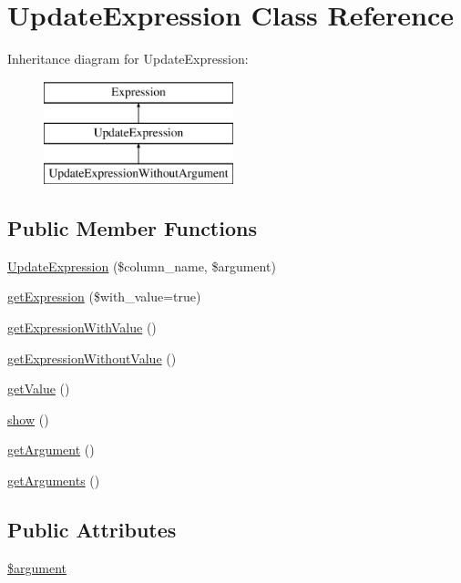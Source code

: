 \hypertarget{classUpdateExpression}{\section{Update\+Expression Class Reference}
\label{classUpdateExpression}
}
Inheritance diagram for Update\+Expression\+:\begin{figure}[H]
\begin{center}
\leavevmode
\includegraphics[height=3.000000cm]{classUpdateExpression}
\end{center}
\end{figure}
\subsection*{Public Member Functions}
\begin{DoxyCompactItemize}
\item 
\hyperlink{classUpdateExpression_a3e1cc24e9a7181ef791586f7607b86b9}{Update\+Expression} (\$column\+\_\+name, \$argument)
\item 
\hyperlink{classUpdateExpression_a1824b01ff4d35cec7d284fcd192d1c58}{get\+Expression} (\$with\+\_\+value=true)
\item 
\hyperlink{classUpdateExpression_abf5aa8ed9c023906f684c31ef735ecd6}{get\+Expression\+With\+Value} ()
\item 
\hyperlink{classUpdateExpression_a91fc65199f195dd3c5ef96a6328b7554}{get\+Expression\+Without\+Value} ()
\item 
\hyperlink{classUpdateExpression_a56d4244ba753a420fc8b6db3b10fc9f9}{get\+Value} ()
\item 
\hyperlink{classUpdateExpression_a3d3ea00a85cdf7e086139e4544e757e0}{show} ()
\item 
\hyperlink{classUpdateExpression_a86d860d80b3053bd4bcff511160aca3b}{get\+Argument} ()
\item 
\hyperlink{classUpdateExpression_a898b47f8e6a8191fd75143d402884b02}{get\+Arguments} ()
\end{DoxyCompactItemize}
\subsection*{Public Attributes}
\begin{DoxyCompactItemize}
\item 
\hyperlink{classUpdateExpression_a5ad6b27dd8458bfdd8317006ec1c5983}{\$argument}
\end{DoxyCompactItemize}


